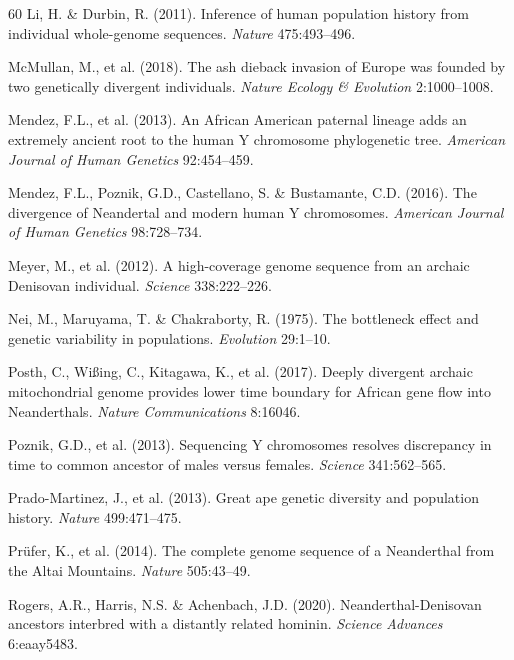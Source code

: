 \begin{thebibliography}{60}
Li, H. \& Durbin, R. (2011). Inference of human population history from
individual whole-genome sequences. \emph{Nature} 475:493--496.

McMullan, M., et al. (2018). The ash dieback invasion of Europe was
founded by two genetically divergent individuals. \emph{Nature Ecology \&
Evolution} 2:1000--1008.

Mendez, F.L., et al. (2013). An African American paternal lineage adds an
extremely ancient root to the human Y chromosome phylogenetic tree.
\emph{American Journal of Human Genetics} 92:454--459.

Mendez, F.L., Poznik, G.D., Castellano, S. \& Bustamante, C.D. (2016).
The divergence of Neandertal and modern human Y chromosomes.
\emph{American Journal of Human Genetics} 98:728--734.

Meyer, M., et al. (2012). A high-coverage genome sequence from an archaic
Denisovan individual. \emph{Science} 338:222--226.

Nei, M., Maruyama, T. \& Chakraborty, R. (1975). The bottleneck effect and
genetic variability in populations. \emph{Evolution} 29:1--10.

Posth, C., Wi\ss{}ing, C., Kitagawa, K., et al. (2017). Deeply divergent
archaic mitochondrial genome provides lower time boundary for African gene
flow into Neanderthals. \emph{Nature Communications} 8:16046.

Poznik, G.D., et al. (2013). Sequencing Y chromosomes resolves discrepancy
in time to common ancestor of males versus females. \emph{Science}
341:562--565.

Prado-Martinez, J., et al. (2013). Great ape genetic diversity and
population history. \emph{Nature} 499:471--475.

Pr\"ufer, K., et al. (2014). The complete genome sequence of a Neanderthal
from the Altai Mountains. \emph{Nature} 505:43--49.

Rogers, A.R., Harris, N.S. \& Achenbach, J.D. (2020). Neanderthal-Denisovan
ancestors interbred with a distantly related hominin. \emph{Science
Advances} 6:eaay5483.


\end{thebibliography}
